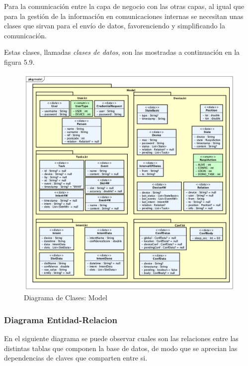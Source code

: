     Para la comunicación entre la capa de negocio con las otras capas, al igual que para la gestión de la información en comunicaciones internas se necesitan unas clases que sirvan para el envío de datos, favorenciendo y simplificando la comunicación.
    
    Estas clases, llamadas \textit{clases de datos}, son las mostradas a continuación en la figura 5.9.

    \begin{figure}[H]
        \centering
        \includegraphics[width=14cm]{./img/arch/back/dc.model.png}
        \caption{Diagrama de Clases: Model}
        \label{fig:dc.model}
    \end{figure}


    \newpage
    \subsubsection{Diagrama Entidad-Relacion}
    
    En el siguiente diagrama se puede observar cuales son las relaciones entre las distintas tablas que componen la base de datos, de modo que se aprecian las dependencias de claves que comparten entre si.
    
